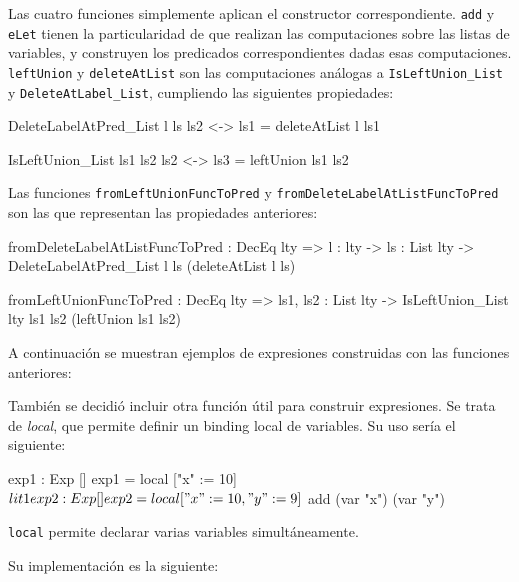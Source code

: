 Las cuatro funciones simplemente aplican el constructor correspondiente. \texttt{add} y \texttt{eLet} tienen la particularidad de que realizan las computaciones sobre las listas de variables, y construyen los predicados correspondientes dadas esas computaciones. \texttt{leftUnion} y \texttt{deleteAtList} son las computaciones análogas a \texttt{IsLeftUnion\_List} y \texttt{DeleteAtLabel\_List}, cumpliendo las siguientes propiedades:

\begin{code}
DeleteLabelAtPred_List l ls ls2 <-> ls1 = deleteAtList l ls1

IsLeftUnion_List ls1 ls2 ls2 <-> ls3 = leftUnion ls1 ls2
\end{code}

Las funciones \texttt{fromLeftUnionFuncToPred} y \texttt{fromDeleteLabelAtListFuncToPred} son las que representan las propiedades anteriores:

\begin{code}
fromDeleteLabelAtListFuncToPred : DecEq lty => {l : lty} ->
  {ls : List lty} -> DeleteLabelAtPred_List l ls (deleteAtList l ls)

fromLeftUnionFuncToPred : DecEq lty => {ls1, ls2 : List lty} ->
  IsLeftUnion_List {lty} ls1 ls2 (leftUnion ls1 ls2)
\end{code}

A continuación se muestran ejemplos de expresiones construidas con las funciones anteriores:


También se decidió incluir otra función útil para construir expresiones. Se trata de \textit{local}, que permite definir un binding local de variables. Su uso sería el siguiente:

\begin{code}
exp1 : Exp []
exp1 = local ["x" := 10] $ lit 1

exp2 : Exp []
exp2 = local ["x" := 10, "y" := 9] $ add (var "x") (var "y")
\end{code}

\texttt{local} permite declarar varias variables simultáneamente.

Su implementación es la siguiente:


